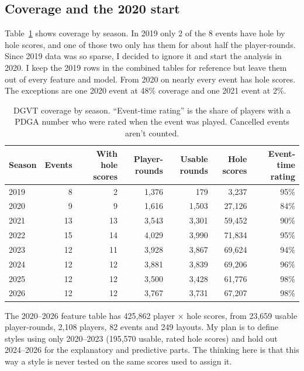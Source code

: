 \documentclass[10pt]{article}
\begin{document}
\subsection{Coverage and the 2020 start}

Table~\ref{tab:coverage} shows coverage by season. In 2019 only 2 of the 8 events have hole by hole scores, and one of those two only has them for about half the player-rounds. Since 2019 data was so sparse, I decided to ignore it and start the analysis in 2020. I keep the 2019 rows in the combined tables for reference but leave them out of every feature and model. From 2020 on nearly every event has hole scores. The exceptions are one 2020 event at 48\% coverage and one 2021 event at 2\%.

\begin{table}[H]
\centering
\footnotesize
\setlength{\tabcolsep}{6pt}
\renewcommand{\arraystretch}{0.92}
\caption{DGVT coverage by season. ``Event-time rating'' is the share of players with a PDGA number who were rated when the event was played. Cancelled events aren't counted.}
\label{tab:coverage}
\begin{tabular}{@{}lrrrrrr@{}}
\toprule
\textbf{Season} & \textbf{Events} & \textbf{With hole scores} & \textbf{Player-rounds} & \textbf{Usable rounds} & \textbf{Hole scores} & \textbf{Event-time rating} \\
\midrule
2019 & 8  & 2  & 1,376 & 179   & 3,237  & 95\% \\
2020 & 9  & 9  & 1,616 & 1,503 & 27,126 & 84\% \\
2021 & 13 & 13 & 3,543 & 3,301 & 59,452 & 90\% \\
2022 & 15 & 14 & 4,029 & 3,990 & 71,834 & 95\% \\
2023 & 12 & 11 & 3,928 & 3,867 & 69,624 & 94\% \\
2024 & 12 & 12 & 3,881 & 3,839 & 69,206 & 96\% \\
2025 & 12 & 12 & 3,500 & 3,428 & 61,776 & 98\% \\
2026 & 12 & 12 & 3,767 & 3,731 & 67,207 & 98\% \\
\bottomrule
\end{tabular}
\end{table}

The 2020--2026 feature table has 425,862 player $\times$ hole scores, from 23,659 usable player-rounds, 2,108 players, 82 events and 249 layouts. My plan is to define styles using only 2020--2023 (195,570 usable, rated hole scores) and hold out 2024--2026 for the explanatory and predictive parts. The thinking here is that this way a style is never tested on the same scores used to assign it.
\end{document}
